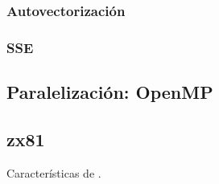 \documentclass[a4paper,spanish,12pt,twoside]{article}
\begin{document}
\subsubsection*{Autovectorización}

\subsubsection*{SSE}

\subsection{Paralelización: OpenMP}

\clearpage
\pagebreak

\begin{appendices}
	\section{zx81}\label{app:zx81}
	Características de .
\end{appendices}
\end{document}
